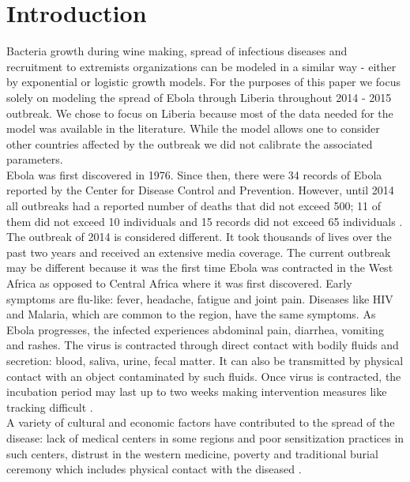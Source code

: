 \documentclass[10pt]{article}
\begin{document}
\section{Introduction}
Bacteria growth during wine making, spread of infectious diseases and recruitment to extremists organizations can be modeled in a similar way - either by exponential or logistic growth models. For the purposes of this paper we focus solely on modeling the spread of Ebola through Liberia throughout 2014 - 2015 outbreak. We chose to focus on Liberia because most of the data needed for the model was available in the literature. While the model allows one to consider other countries affected by the outbreak we did not calibrate the associated parameters. \\
%
%
%
Ebola was first discovered in 1976. Since then, there were 34 records of Ebola reported by the Center for Disease Control and Prevention. However, until 2014 all outbreaks had a reported number of deaths that did not exceed 500; 11 of them did not exceed 10 individuals and 15 records did not exceed 65 individuals \cite{CDCOutbreaks}.  The outbreak of 2014 is considered different. It took thousands of lives over the past two years and received an extensive media coverage.
%
%
%
The current outbreak may be different because it was the first time Ebola was contracted in the West Africa as opposed to Central Africa where it was first discovered. Early symptoms are flu-like: fever, headache, fatigue and joint pain. Diseases like HIV and Malaria, which are common to the region, have the same symptoms. As Ebola progresses, the infected experiences abdominal pain, diarrhea, vomiting and rashes. The virus is contracted through direct contact with bodily fluids and secretion: blood, saliva, urine, fecal matter. It can also be transmitted by physical contact with an object contaminated by such fluids. Once virus is contracted, the incubation period may last up to two weeks making intervention measures like tracking difficult \cite{CDCSympt}. 
%
%
%
\\A variety of cultural and economic factors have contributed to the spread of the disease: lack of medical centers in some regions and poor sensitization practices in such centers, distrust in the western medicine, poverty and traditional burial ceremony which includes physical contact with the diseased \cite{WHOReasons}. \\
%
%
%
\end{document}
